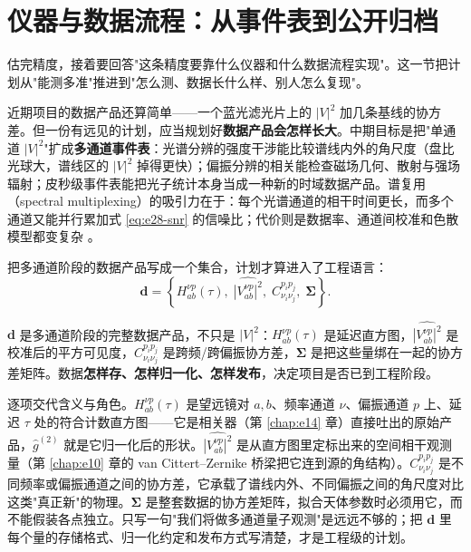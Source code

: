 \section{仪器与数据流程：从事件表到公开归档}
\label{sec:e28-pipeline}

估完精度，接着要回答"这条精度要靠什么仪器和什么数据流程实现"。这一节把计划从"能测多准"推进到"怎么测、数据长什么样、别人怎么复现"。

近期项目的数据产品还算简单——一个蓝光滤光片上的 \(|V|^2\) 加几条基线的协方差。但一份有远见的计划，应当规划好\textbf{数据产品会怎样长大}。中期目标是把"单通道 \(|V|^2\)"扩成\textbf{多通道事件表}：光谱分辨的强度干涉能比较谱线内外的角尺度（盘比光球大，谱线区的 \(|V|^2\) 掉得更快）；偏振分辨的相关能检查磁场几何、散射与强场辐射；皮秒级事件表能把光子统计本身当成一种新的时域数据产品。谱复用（spectral multiplexing）的吸引力在于：每个光谱通道的相干时间更长，而多个通道又能并行累加式 \eqref{eq:e28-snr} 的信噪比；代价则是数据率、通道间校准和色散模型都变复杂 \citep{2021sf2a.conf..335L,2022MNRAS.512.1722K,2024MNRAS.529.4387A}。

把多通道阶段的数据产品写成一个集合，计划才算进入了工程语言：
\begin{equation}
  \bm{d}=
  \left\{
  H_{ab}^{\nu p}(\tau),\;
  \widehat{|V_{ab}^{\nu p}|^2},\;
  C_{\nu_i\nu_j}^{p_i p_j},\;
  \bm{\Sigma}
  \right\}.
  \label{eq:e28-data}
\end{equation}
\begin{formulaexplain}
\(\bm d\) 是多通道阶段的完整数据产品，不只是 \(|V|^2\)：\(H_{ab}^{\nu p}(\tau)\) 是延迟直方图，\(\widehat{|V_{ab}^{\nu p}|^2}\) 是校准后的平方可见度，\(C_{\nu_i\nu_j}^{p_i p_j}\) 是跨频/跨偏振协方差，\(\bm\Sigma\) 是把这些量绑在一起的协方差矩阵。数据\textbf{怎样存、怎样归一化、怎样发布}，决定项目是否已到工程阶段。
\end{formulaexplain}
逐项交代含义与角色。\(H_{ab}^{\nu p}(\tau)\) 是望远镜对 \(a,b\)、频率通道 \(\nu\)、偏振通道 \(p\) 上、延迟 \(\tau\) 处的符合计数直方图——它是相关器（第 \ref{chap:e14} 章）直接吐出的原始产品，\(\hat g^{(2)}\) 就是它归一化后的形状。\(\widehat{|V_{ab}^{\nu p}|^2}\) 是从直方图里定标出来的空间相干观测量（第 \ref{chap:e10} 章的 van Cittert--Zernike 桥梁把它连到源的角结构）。\(C_{\nu_i\nu_j}^{p_i p_j}\) 是不同频率或偏振通道之间的协方差，它承载了谱线内外、不同偏振之间的角尺度对比这类"真正新"的物理。\(\bm\Sigma\) 是整套数据的协方差矩阵，拟合天体参数时必须用它，而不能假装各点独立。只写一句"我们将做多通道量子观测"是远远不够的；把 \(\bm d\) 里每个量的存储格式、归一化约定和发布方式写清楚，才是工程级的计划。

